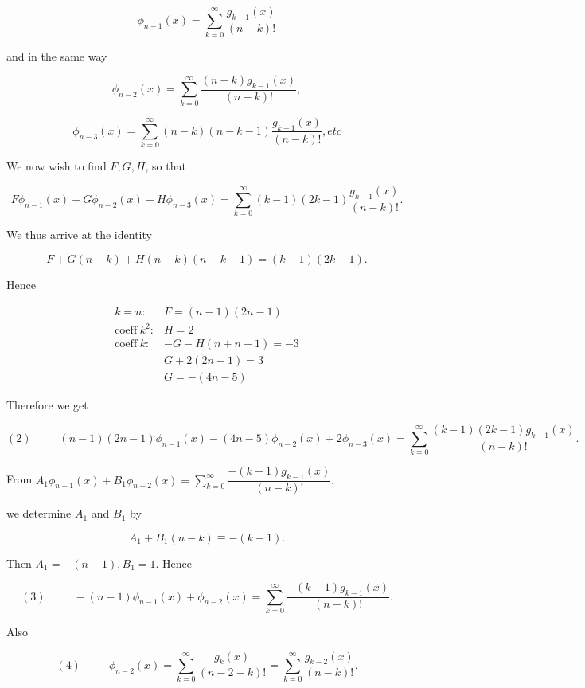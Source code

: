 \begin{solution}
$$\phi_{n-1}(x) = \displaystyle\sum_{k=0}^{\infty} \dfrac{g_{k-1}(x)}{(n-k)!}$$

and in the same way

$$\phi_{n-2}(x) = \displaystyle\sum_{k=0}^{\infty} \dfrac{(n-k)g_{k-1}(x)}{(n-k)!},$$

$$\phi_{n-3}(x) = \displaystyle\sum_{k=0}^{\infty} (n-k)(n-k-1) \dfrac{g_{k-1}(x)}{(n-k)!},etc$$

We now wish to find $F,G,H$, so that

$$F \phi_{n-1}(x) + G \phi_{n-2}(x) + H \phi_{n-3}(x) = \displaystyle\sum_{k=0}^{\infty} (k-1)(2k-1) \dfrac{g_{k-1}(x)}{(n-k)!}.$$

We thus arrive at the identity

$$F + G(n-k)+H(n-k)(n-k-1) = (k-1)(2k-1).$$

Hence

$$\begin{array}{ll}
k=n: & F=(n-1)(2n-1) \\
\mathrm{coeff \hspace{3pt}} k^2: & H=2 \\
\mathrm{coeff \hspace{3pt}} k: & -G -H(n+n-1) = -3 \\
& G+2(2n-1) = 3 \\
& G = -(4n-5)
\end{array}$$

Therefore we get

$$(2) \hspace{30pt} (n-1)(2n-1)\phi_{n-1}(x) - (4n-5)\phi_{n-2}(x) + 2\phi_{n-3}(x) = \displaystyle\sum_{k=0}^{\infty} \dfrac{(k-1)(2k-1)g_{k-1}(x)}{(n-k)!}.$$

From $A_1 \phi_{n-1}(x) + B_1 \phi_{n-2}(x) = \displaystyle\sum_{k=0}^{\infty} \dfrac{-(k-1)g_{k-1}(x)}{(n-k)!},$

we determine $A_1$ and $B_1$ by

$$A_1 + B_1(n-k) \equiv -(k-1).$$

Then $A_1=-(n-1), B_1=1$. Hence

$$(3) \hspace{30pt} -(n-1)\phi_{n-1}(x) + \phi_{n-2}(x) = \displaystyle\sum_{k=0}^{\infty} \dfrac{-(k-1)g_{k-1}(x)}{(n-k)!}.$$

Also

$$(4) \hspace{30pt} \phi_{n-2}(x) = \displaystyle\sum_{k=0}^{\infty} \dfrac{g_k(x)}{(n-2-k)!} = \displaystyle\sum_{k=0}^{\infty} \dfrac{g_{k-2}(x)}{(n-k)!}.$$


\end{solution}
